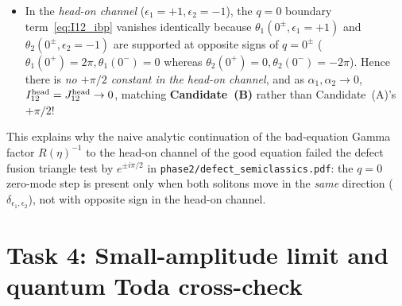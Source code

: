 \documentclass[11pt,a4paper]{article}
\theoremstyle{remark}
\begin{document}
\begin{enumerate}
\begin{itemize}
\item In the \emph{head-on channel} ($\epsilon_1=+1,\epsilon_2=-1$), the $q=0$ boundary term~\eqref{eq:I12_ibp} vanishes identically because $\theta_1(0^\pm,\epsilon_1=+1)$ and $\theta_2(0^\pm,\epsilon_2=-1)$ are supported at opposite signs of $q=0^\pm$ ($\theta_1(0^+)=2\pi,\theta_1(0^-)=0$ whereas $\theta_2(0^+)=0,\theta_2(0^-)=-2\pi$). Hence there is \emph{no $+\pi/2$ constant in the head-on channel}, and as $\alpha_1,\alpha_2\to 0$, $I_{12}^{\rm head}=J_{12}^{\rm head}\to 0$, matching \textbf{Candidate~(B)} rather than Candidate~(A)'s $+\pi/2$!
\end{itemize}
This explains why the naive analytic continuation of the bad-equation Gamma factor $R(\eta)^{-1}$ to the head-on channel of the good equation failed the defect fusion triangle test by $e^{\pm i\pi/2}$ in \texttt{phase2/defect\_semiclassics.pdf}: the $q=0$ zero-mode step is present only when both solitons move in the \emph{same} direction ($\delta_{\epsilon_1,\epsilon_2}$), not with opposite sign in the head-on channel.
\end{enumerate}

\section{Task 4: Small-amplitude limit and quantum Toda cross-check}\label{sec:task4}
\end{document}
